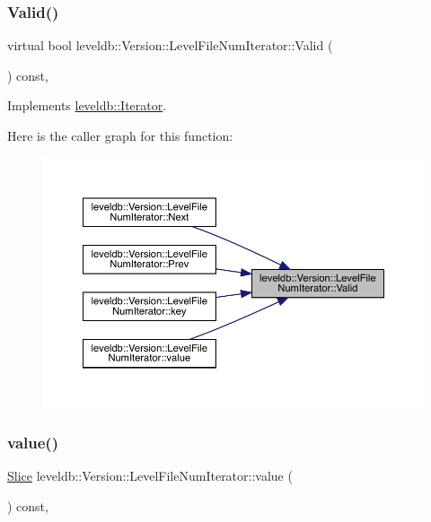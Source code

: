 \subsubsection{\texorpdfstring{Valid()}{Valid()}}
{\footnotesize\ttfamily virtual bool leveldb\+::\+Version\+::\+Level\+File\+Num\+Iterator\+::\+Valid (\begin{DoxyParamCaption}{ }\end{DoxyParamCaption}) const\hspace{0.3cm}{\ttfamily [inline]}, {\ttfamily [virtual]}}



Implements \mbox{\hyperlink{classleveldb_1_1_iterator_a38614978bfa0586327b8e237bcb46012}{leveldb\+::\+Iterator}}.

Here is the caller graph for this function\+:
\nopagebreak
\begin{figure}[H]
\begin{center}
\leavevmode
\includegraphics[width=350pt]{classleveldb_1_1_version_1_1_level_file_num_iterator_a9bf0e045961ed325d37bfaa8b2c77e8b_icgraph}
\end{center}
\end{figure}
\mbox{\label{classleveldb_1_1_version_1_1_level_file_num_iterator_af7b7da923a316d8b85f7194c926470db}} 
\subsubsection{\texorpdfstring{value()}{value()}}
{\footnotesize\ttfamily \mbox{\hyperlink{classleveldb_1_1_slice}{Slice}} leveldb\+::\+Version\+::\+Level\+File\+Num\+Iterator\+::value (\begin{DoxyParamCaption}{ }\end{DoxyParamCaption}) const\hspace{0.3cm}{\ttfamily [inline]}, {\ttfamily [virtual]}}



